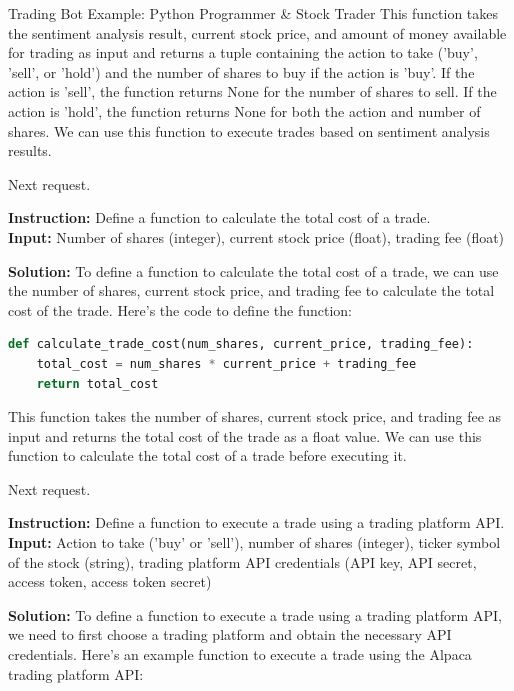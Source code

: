 \begin{AIBoxBreak}{Trading Bot Example: Python Programmer \& Stock Trader}
	This function takes the sentiment analysis result, current stock price, and amount of money available for trading as input and returns a tuple containing the action to take ('buy', 'sell', or 'hold') and the number of shares to buy if the action is 'buy'. If the action is 'sell', the function returns None for the number of shares to sell. If the action is 'hold', the function returns None for both the action and number of shares. We can use this function to execute trades based on sentiment analysis results.

	Next request.\\

	\usermsg

	\textbf{Instruction:} Define a function to calculate the total cost of a trade.\\
	\textbf{Input:} Number of shares (integer), current stock price (float), trading fee (float)\\

	\assistantmsg

	\textbf{Solution:} To define a function to calculate the total cost of a trade, we can use the number of shares, current stock price, and trading fee to calculate the total cost of the trade. Here's the code to define the function:

	\begin{lstlisting}[language=Python]
def calculate_trade_cost(num_shares, current_price, trading_fee):
    total_cost = num_shares * current_price + trading_fee
    return total_cost
\end{lstlisting}

	This function takes the number of shares, current stock price, and trading fee as input and returns the total cost of the trade as a float value. We can use this function to calculate the total cost of a trade before executing it.

	Next request.\\

	\usermsg

	\textbf{Instruction:} Define a function to execute a trade using a trading platform API.\\
	\textbf{Input:} Action to take ('buy' or 'sell'), number of shares (integer), ticker symbol of the stock (string), trading platform API credentials (API key, API secret, access token, access token secret)\\

	\assistantmsg

	\textbf{Solution:} To define a function to execute a trade using a trading platform API, we need to first choose a trading platform and obtain the necessary API credentials. Here's an example function to execute a trade using the Alpaca trading platform API:


\end{AIBoxBreak}
